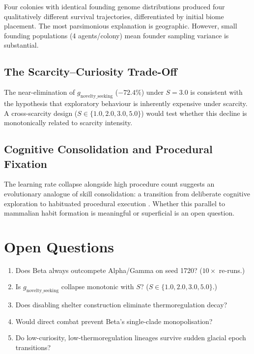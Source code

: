 \documentclass[12pt,a4paper]{article}
\begin{document}
Four colonies with identical founding genome distributions produced four qualitatively different survival trajectories, differentiated by initial biome placement. The most parsimonious explanation is geographic. However, small founding populations (4 agents/colony) mean founder sampling variance is substantial.

\subsection{The Scarcity--Curiosity Trade-Off}

The near-elimination of $g_{\text{novelty\_seeking}}$ ($-72.4\%$) under $S{=}3.0$ is consistent with the hypothesis that exploratory behaviour is inherently expensive under scarcity. A cross-scarcity design ($S \in \{1.0, 2.0, 3.0, 5.0\}$) would test whether this decline is monotonically related to scarcity intensity.

\subsection{Cognitive Consolidation and Procedural Fixation}

The learning rate collapse alongside high procedure count suggests an evolutionary analogue of skill consolidation: a transition from deliberate cognitive exploration to habituated procedural execution \cite{balleine2010}. Whether this parallel to mammalian habit formation is meaningful or superficial is an open question.

\section{Open Questions}

\begin{enumerate}[label=\arabic*.]
  \item Does Beta always outcompete Alpha/Gamma on seed 1720? ($10\times$ re-runs.)
  \item Is $g_{\text{novelty\_seeking}}$ collapse monotonic with $S$? ($S \in \{1.0, 2.0, 3.0, 5.0\}$.)
  \item Does disabling shelter construction eliminate thermoregulation decay?
  \item Would direct combat prevent Beta's single-clade monopolisation?
  \item Do low-curiosity, low-thermoregulation lineages survive sudden glacial epoch transitions?
\end{enumerate}
\end{document}
